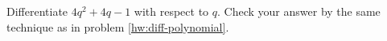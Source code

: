 Differentiate $4q^2+4q-1$ with respect to $q$. 
Check your answer by the same
technique as in problem \ref{hw:diff-polynomial}.
\answercheck
